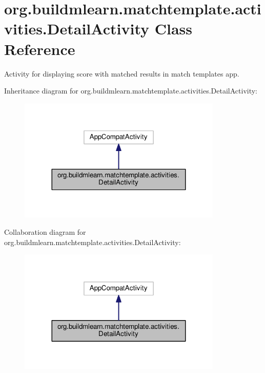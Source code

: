 \hypertarget{classorg_1_1buildmlearn_1_1matchtemplate_1_1activities_1_1DetailActivity}{}\section{org.\+buildmlearn.\+matchtemplate.\+activities.\+Detail\+Activity Class Reference}
\label{classorg_1_1buildmlearn_1_1matchtemplate_1_1activities_1_1DetailActivity}


Activity for displaying score with matched results in match template\textquotesingle{}s app.  




Inheritance diagram for org.\+buildmlearn.\+matchtemplate.\+activities.\+Detail\+Activity\+:
\nopagebreak
\begin{figure}[H]
\begin{center}
\leavevmode
\includegraphics[width=275pt]{classorg_1_1buildmlearn_1_1matchtemplate_1_1activities_1_1DetailActivity__inherit__graph}
\end{center}
\end{figure}


Collaboration diagram for org.\+buildmlearn.\+matchtemplate.\+activities.\+Detail\+Activity\+:
\nopagebreak
\begin{figure}[H]
\begin{center}
\leavevmode
\includegraphics[width=275pt]{classorg_1_1buildmlearn_1_1matchtemplate_1_1activities_1_1DetailActivity__coll__graph}
\end{center}
\end{figure}
